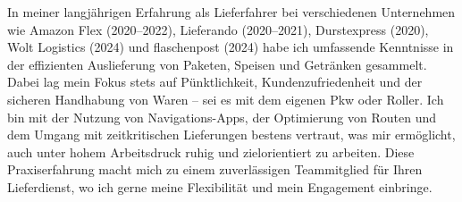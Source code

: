 In meiner langjährigen Erfahrung als Lieferfahrer bei verschiedenen Unternehmen wie Amazon Flex (2020–2022), Lieferando (2020–2021), Durstexpress (2020), Wolt Logistics (2024) und flaschenpost (2024) habe ich umfassende Kenntnisse in der effizienten Auslieferung von Paketen, Speisen und Getränken gesammelt.
Dabei lag mein Fokus stets auf Pünktlichkeit, Kundenzufriedenheit und der sicheren Handhabung von Waren – sei es mit dem eigenen Pkw oder Roller.
Ich bin mit der Nutzung von Navigations-Apps, der Optimierung von Routen und dem Umgang mit zeitkritischen Lieferungen bestens vertraut, was mir ermöglicht, auch unter hohem Arbeitsdruck ruhig und zielorientiert zu arbeiten.
Diese Praxiserfahrung macht mich zu einem zuverlässigen Teammitglied für Ihren Lieferdienst, wo ich gerne meine Flexibilität und mein Engagement einbringe.